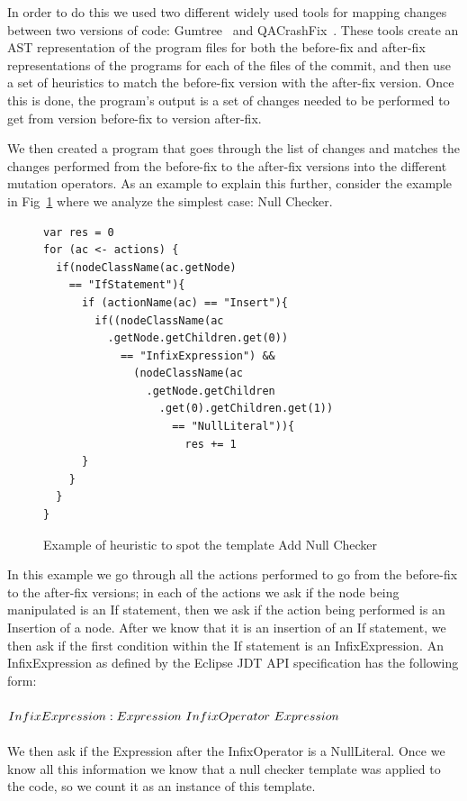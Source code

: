\documentclass[conference]{IEEEtran}
\begin{document}
In order to do this we used two different widely used tools for mapping changes 
between two versions of code: Gumtree~\cite{falleri14} and QACrashFix~\cite{gao15}.
These tools create an AST representation of the program files for both the 
before-fix and after-fix representations of the programs for each of the files 
of the commit, and then use a set of heuristics to match the before-fix version 
with the after-fix version. Once this is done, the program's output is a set of 
changes needed to be performed to get from version before-fix to version 
after-fix.

We then created a program that goes through the list of changes and matches the changes performed from the before-fix to the after-fix versions into the different mutation operators. As an example to explain this further, consider the example in Fig~\ref{fig:codeSnippet} where we analyze the simplest case: Null Checker.





\begin{figure}[!]

\begin{verbatim}
var res = 0
for (ac <- actions) {
  if(nodeClassName(ac.getNode) 
    == "IfStatement"){
      if (actionName(ac) == "Insert"){
        if((nodeClassName(ac
          .getNode.getChildren.get(0)) 
            == "InfixExpression") && 
              (nodeClassName(ac
                .getNode.getChildren
                  .get(0).getChildren.get(1)) 
                    == "NullLiteral")){
                      res += 1
      }
    }
  }
}
\end{verbatim}
\caption{Example of heuristic to spot the template Add Null Checker}\label{fig:codeSnippet}
\end{figure}




In this example we go through all the actions performed to go from the before-fix to the after-fix versions; in each of the actions we ask if the node being manipulated is an If statement, then we ask if the action being performed is an Insertion of a node. After we know that it is an insertion of an If statement, we then ask if the first condition within the If statement is an InfixExpression. An InfixExpression as defined by the Eclipse JDT API specification has the following form:
\\
\\
$InfixExpression: \\
Expression~InfixOperator~Expression
$
\\
\\  
We then ask if the Expression after the InfixOperator is a NullLiteral. Once we know all this information we know that a null checker template was applied to the code, so we count it as an instance of this template.
\end{document}
